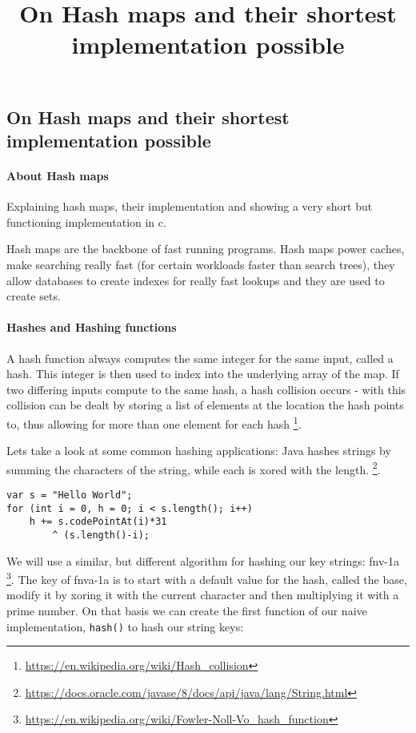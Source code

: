 

\title{On Hash maps and their shortest implementation possible}


    \subsection*{On Hash maps and their shortest implementation possible}

    \paragraph*{About Hash maps}

    Explaining hash maps, their implementation and showing a very short but
    functioning implementation in c.

    Hash maps are the backbone of fast running programs. Hash maps power
    caches, make searching really fast (for certain workloads faster than
    search trees), they allow databases to create indexes for really fast
    lookups and they are used to create sets.

    \paragraph*{Hashes and Hashing functions}

    A hash function always computes the same integer for the same input, called
    a hash. This integer is then used to index into the underlying array of the
    map. If two differing inputs compute to the same hash, a hash collision
    occurs - with this collision can be dealt by storing a list of elements at
    the location the hash points to, thus allowing for more than one element
    for each hash
    \footnote{\href{https://en.wikipedia.org/wiki/Hash_collision}{https://en.wikipedia.org/wiki/Hash\_collision}}.

    Lets take a look at some common hashing applications: Java hashes strings
    by summing the characters of the string, while each is xored with the
    length. 
    \footnote{\href{https://docs.oracle.com/javase/8/docs/api/java/lang/String.html\#hashCode}{https://docs.oracle.com/javase/8/docs/api/java/lang/String.html}}.
    \begin{verbatim}
var s = "Hello World";
for (int i = 0, h = 0; i < s.length(); i++)
    h += s.codePointAt(i)*31 
        ^ (s.length()-i);
    \end{verbatim}

    We will use a similar, but different algorithm for hashing our key strings:
    fnv-1a
    \footnote{\href{https://en.wikipedia.org/wiki/Fowler-Noll-Vo_hash_function}{https://en.wikipedia.org/wiki/Fowler-Noll-Vo\_hash\_function}}.
    The key of fnva-1a is to start with a default value for the hash, called
    the base, modify it by xoring it with the current character and then
    multiplying it with a prime number. On that basis we can create the first
    function of our naive implementation, \texttt{hash()} to hash our string
    keys:

